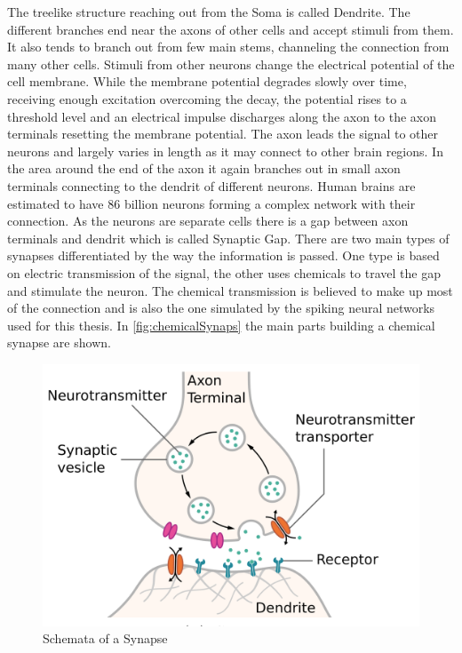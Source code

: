 The treelike structure reaching out from the Soma is called Dendrite. The different branches end near the axons of other cells and accept stimuli from them. It also tends to branch out from few main stems, channeling the connection from many other cells. Stimuli from other neurons change the electrical potential of the cell membrane. While the membrane potential degrades slowly over time, receiving enough excitation overcoming the decay, the potential rises to a threshold level and an electrical impulse discharges along the axon to the axon terminals resetting the membrane potential. The axon leads the signal to other neurons and largely varies in length as it may connect to other brain regions. In the area around the end of the axon it again branches out in small axon terminals connecting to the dendrit of different neurons. Human brains are estimated to have 86 billion neurons forming a complex network with their connection.
\newline
As the neurons are separate cells there is a gap between axon terminals and dendrit which is called Synaptic Gap. There are two main types of synapses differentiated by the way the information is passed. One type is based on electric transmission of the signal, the other uses chemicals to travel the gap and stimulate the neuron. The chemical transmission is believed to make up most of the connection and is also the one simulated by the spiking neural networks used for this thesis. In \autoref{fig:chemicalSynaps} the main parts building a chemical synapse are shown.
\begin{figure}[htpb]
  \centering
  \includegraphics[scale=0.25]{figures/synapse.png}
  \caption{Schemata of a Synapse \cite{wikiSyn}}
  \label{fig:chemicalSynaps}
\end{figure}
